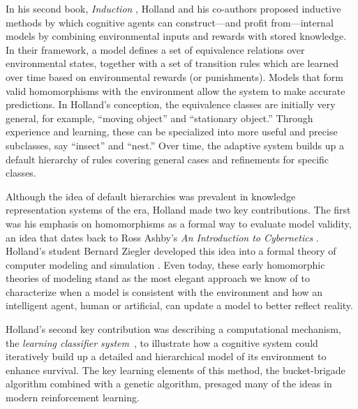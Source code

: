 \documentclass{sig-alternate}
\begin{document}
In his second book, \emph{Induction} \cite{Holland1989}, Holland and
his co-authors proposed inductive methods by which 
cognitive agents can
construct---and profit from---internal models by combining
environmental inputs and rewards with stored knowledge.  In their
framework, a model defines a set of equivalence relations over
environmental states, together with a set of transition rules which
are learned over time based on environmental rewards (or punishments).
Models that form valid homomorphisms with the environment allow the
system to make accurate predictions.  In Holland's conception, the
equivalence classes are initially very general, for example, ``moving object''
and ``stationary object.'' Through experience and
learning, these can be specialized into more useful and precise subclasses, say
``insect'' and ``nest.''  Over time, the adaptive system builds up a
default hierarchy of rules covering general cases and refinements for
specific classes.


Although the idea of default hierarchies was prevalent in 
knowledge representation systems of the era, Holland made two key
contributions.  The first was his emphasis on homomorphisms as a formal way to
evaluate model validity, an idea that dates back to Ross Ashby's
\emph{An Introduction to Cybernetics} \cite{Ashby1956}. Holland's student
Bernard Ziegler developed this idea into a formal theory of computer modeling
and simulation \cite{Ziegler1976}.  
Even today, these early homomorphic theories of modeling
stand as the most elegant approach we know of to characterize when
a model is consistent with the environment and how an intelligent
agent, human or artificial, can update a model to better reflect
reality.

Holland's second key contribution was describing a computational
mechanism, the \emph{learning classifier
  system}~\cite{Holland1986,Holland1977}, to illustrate how a cognitive system could
iteratively build up a detailed and hierarchical model of its
environment to enhance survival.  The key learning elements of this method, the
bucket-brigade algorithm combined with a genetic algorithm, presaged many of the ideas in modern reinforcement
learning. 
\end{document}
